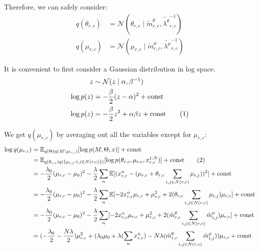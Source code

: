 \documentclass[12pt]{article}
\newcommand\numberthis{\addtocounter{equation}{1}\tag{\theequation}}
\newenvironment{problem}[2][Problem]{\begin{trivlist}
\item[\hskip \labelsep {\bfseries #1}\hskip \labelsep {\bfseries #2.}]}{\end{trivlist}}
\begin{document}
\begin{problem}{2.9.25}
Therefore, we can safely consider:
\begin{align*}
    q(\theta_{r,c}) &= \mathcal{N}(\theta_{r,c} 
                \mid \tilde{m}^{\theta}_{r,c}, \tilde{\lambda^{\theta}}^{-1}_{r,c}) \\
    q(\mu_{r,c}) &= \mathcal{N}(\mu_{r,c} 
                \mid \tilde{m}^{\mu}_{r,c}, \tilde{\lambda^{\mu}}^{-1}_{r,c})
\end{align*}

It is convenient to first consider a Gaussian distribution in log space.
\begin{align*}
    z &\sim \mathcal{N}(z\mid \alpha, \beta^{-1}) \\
    \log p(z) &= -\frac{\beta}{2}(z - \alpha)^2 +\text{const} \\
    \log p(z) &= -\frac{\beta}{2}z^2 + \alpha\beta z + \text{const} \numberthis \label{eq:logspaceNormal}
\end{align*}

We get $q(\mu_{r,c})$ by averaging out all the variables except for $\mu_{r,c}$:
\begin{align*}
    \log q(\mu_{r,c}) &= 
        \mathbb{E}_{q(\Theta)q(M\backslash\mu_{r,c})}[\log p(M, \Theta, x)] 
        + \text{const} \\
    &= \mathbb{E}_{q(\theta_{r,c})q(\{\mu_{i,j}: i, j \in N(r,c)\})}[\log p(\theta_{r,c}, \mu_{r,c}, x^{1:N}_{r,c})]
    + \text{const} \numberthis \label{eq:q29_indep_asumpt} \\
    &= -\frac{\lambda_0}{2}(\mu_{r,c} - \mu_0)^2
    -\frac{\lambda}{2}\sum_n\mathbb{E}[(x^n_{r,c} - (\mu_{r,c} + \theta_{r,c}\sum_{i,j \in N(r,c)}\mu_{i,j}))^2] + \text{const} \\
    &= -\frac{\lambda_0}{2}(\mu_{r,c} - \mu_0)^2 
    -\frac{\lambda}{2}\sum_n\mathbb{E}[-2x^n_{r,c}\mu_{r,c} + \mu_{r,c}^2 + 2(\theta_{r,c}\sum_{i,j \in N(r,c)}\mu_{i,j})\mu_{r,c}]
    + \text{const} \\
    &= -\frac{\lambda_0}{2}(\mu_{r,c} - \mu_0)^2 
    -\frac{\lambda}{2}\sum_n[-2x^n_{r,c}\mu_{r,c} + \mu_{r,c}^2 + 2(\tilde{m}^{\theta}_{r,c}\sum_{i,j \in N(r,c)}\tilde{m}^{\mu}_{i,j})\mu_{r,c}]
    + \text{const} \\
    &= (-\frac{\lambda_0}{2} -\frac{N\lambda}{2})\mu_{r,c}^2
    + (\lambda_0\mu_0 + \lambda (\sum_n x^n_{r,c}) -N\lambda(\tilde{m}^{\theta}_{r,c}\sum_{i,j \in N(r,c)}\tilde{m}^{\mu}_{i,j}))\mu_{r,c}
    + \text{const} \\
\end{align*}


\end{problem}
\end{document}
